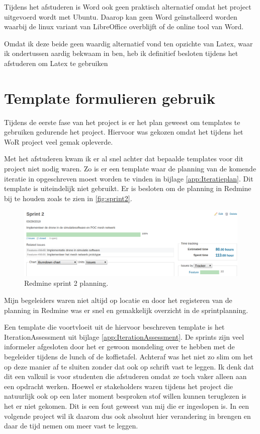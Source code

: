 \documentclass[a4paper, 11pt, oneside]{report}
\begin{document}
Tijdens het afstuderen is Word ook geen praktisch alternatief omdat het project uitgevoerd wordt met Ubuntu. 
Daarop kan geen Word geïnstalleerd worden waarbij de linux variant van LibreOffice overblijft of de online tool van Word.

Omdat ik deze beide geen waardig alternatief vond ten opzichte van Latex, waar ik ondertussen aardig bekwaam in ben, heb ik definitief besloten tijdens het afstuderen om Latex te gebruiken

\section{Template formulieren gebruik}

Tijdens de eerste fase van het project is er het plan geweest om templates te gebruiken gedurende het project.
Hiervoor was gekozen omdat het tijdens het WoR project veel gemak opleverde. 

Met het afstuderen kwam ik er al snel achter dat bepaalde templates voor dit project niet nodig waren.
Zo is er een template waar de planning van de komende iteratie in opgeschreven moest worden te vinden in bijlage \ref{app:Iteratieplan}.
Dit template is uiteindelijk niet gebruikt. Er is besloten om de planning in Redmine bij te houden zoals te zien in \autoref{fig:sprint2}.

\begin{figure}[H]
	\begin{center}\includegraphics[width=1\linewidth]{Afbeeldingen/sprint2.png}\end{center}
	\caption{Redmine sprint 2 planning.}
	\label{fig:sprint2}
\end{figure}

Mijn begeleiders waren niet altijd op locatie en door het registeren van de planning in Redmine was er snel en gemakkelijk overzicht in de sprintplanning.

Een template die voortvloeit uit de hiervoor beschreven template is het IterationAssessment uit bijlage \ref{app:IterationAssessment}.
De sprints zijn veel informeler afgesloten door het er gewoon mondeling over te hebben met de begeleider tijdens de lunch of de koffietafel.
Achteraf was het niet zo slim om het op deze manier af te sluiten zonder dat ook op schrift vast te leggen.
Ik denk dat dit een valkuil is voor studenten die afstuderen omdat ze toch vaker alleen aan een opdracht werken.
Hoewel er stakeholders waren tijdens het project die natuurlijk ook op een later moment besproken stof willen kunnen teruglezen is het er niet gekomen.
Dit is een fout geweest van mij die er ingeslopen is.
In een volgende project wil ik daarom dus ook absoluut hier verandering in brengen en daar de tijd nemen om meer vast te leggen.   
\end{document}
